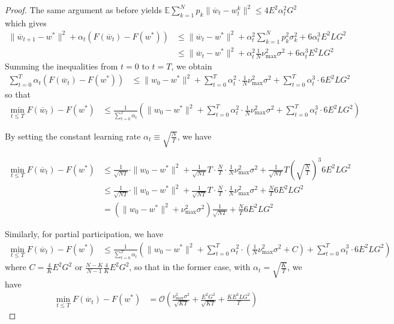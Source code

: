 \begin{proof}
	The same argument as before yields $\mathbb{E}\sum_{k=1}^{N}p_{k}\|\overline{w}_{t}-w_{t}^{k}\|^{2}\leq4E^{2}\alpha_{t}^{2}G^{2}$
	which gives 
	\begin{align*}
	\|\overline{w}_{t+1}-w^{\ast}\|^{2}+\alpha_{t}(F(\overline{w}_{t})-F(w^{\ast})) & \leq\|\overline{w}_{t}-w^{\ast}\|^{2}+\alpha_{t}^{2}\sum_{k=1}^{N}p_{k}^{2}\sigma_{k}^{2}+6\alpha_{t}^{3}E^{2}LG^{2}\\
	& \leq\|\overline{w}_{t}-w^{\ast}\|^{2}+\alpha_{t}^{2}\frac{1}{N}\nu_{\max}^{2}\sigma^{2}+6\alpha_{t}^{3}E^{2}LG^{2}
	\end{align*}
	Summing the inequalities from $t=0$ to $t=T$, we obtain 
	\begin{align*}
	\sum_{t=0}^{T}\alpha_{t}(F(\overline{w}_{t})-F(w^{\ast})) & \leq\|w_{0}-w^{\ast}\|^{2}+\sum_{t=0}^{T}\alpha_{t}^{2}\cdot\frac{1}{N}\nu_{\max}^{2}\sigma^{2}+\sum_{t=0}^{T}\alpha_{t}^{3}\cdot6E^{2}LG^{2}
	\end{align*}
	so that
	\begin{align*}
	\min_{t\leq T}F(\overline{w}_{t})-F(w^{\ast}) & \leq\frac{1}{\sum_{t=0}^{T}\alpha_{t}}\left(\|w_{0}-w^{\ast}\|^{2}+\sum_{t=0}^{T}\alpha_{t}^{2}\cdot\frac{1}{N}\nu_{\max}^{2}\sigma^{2}+\sum_{t=0}^{T}\alpha_{t}^{3}\cdot6E^{2}LG^{2}\right)
	\end{align*}
	
	By setting the constant learning rate $\alpha_{t}\equiv\sqrt{\frac{N}{T}}$,
	we have 
	
	\begin{align*}
	\min_{t\leq T}F(\overline{w}_{t})-F(w^{\ast}) & \leq\frac{1}{\sqrt{NT}}\cdot\|w_{0}-w^{\ast}\|^{2}+\frac{1}{\sqrt{NT}}T\cdot\frac{N}{T}\cdot\frac{1}{N}\nu_{\max}^{2}\sigma^{2}+\frac{1}{\sqrt{NT}}T(\sqrt{\frac{N}{T}})^{3}6E^{2}LG^{2}\\
	& \leq\frac{1}{\sqrt{NT}}\cdot\|w_{0}-w^{\ast}\|^{2}+\frac{1}{\sqrt{NT}}T\cdot\frac{N}{T}\cdot\frac{1}{N}\nu_{\max}^{2}\sigma^{2}+\frac{N}{T}6E^{2}LG^{2}\\
	& =(\|w_{0}-w^{\ast}\|^{2}+\nu_{\max}^{2}\sigma^{2})\frac{1}{\sqrt{NT}}+\frac{N}{T}6E^{2}LG^{2}
	\end{align*}
	
	Similarly, for partial participation, we have 
	\begin{align*}
	\min_{t\leq T}F(\overline{w}_{t})-F(w^{\ast}) & \leq\frac{1}{\sum_{t=0}^{T}\alpha_{t}}\left(\|w_{0}-w^{\ast}\|^{2}+\sum_{t=0}^{T}\alpha_{t}^{2}\cdot(\frac{1}{N}\nu_{\max}^{2}\sigma^{2}+C)+\sum_{t=0}^{T}\alpha_{t}^{3}\cdot6E^{2}LG^{2}\right)
	\end{align*}
	where $C=\frac{4}{K}E^{2}G^{2}$ or $\frac{N-K}{N-1}\frac{4}{K}E^{2}G^{2}$,
	so that in the former case, with $\alpha_{t}=\sqrt{\frac{K}{T}}$,
	we have 
	\begin{align*}
	\min_{t\leq T}F(\overline{w}_{t})-F(w^{\ast}) & =\mathcal{O}(\frac{\nu_{\max}^{2}\sigma^{2}}{\sqrt{KT}}+\frac{E^{2}G^{2}}{\sqrt{KT}}+\frac{KE^{2}LG^{2}}{T})
	\end{align*}
\end{proof}